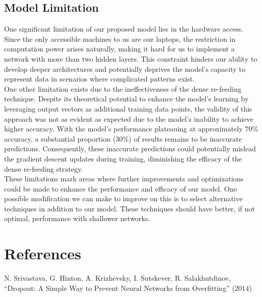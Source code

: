 \documentclass{article}
\begin{document}
\subsection{Model Limitation}
One significant limitation of our proposed model lies in the hardware access. Since the only accessible machines to us are our laptops, the restriction in computation power arises naturally, making it hard for us to implement a network with more than two hidden layers. This constraint hinders our ability to develop deeper architectures and potentially deprives the model's capacity to represent data in scenarios where complicated patterns exist.\\

\noindent One other limitation exists due to the ineffectiveness of the dense re-feeding technique. Despite its theoretical potential to enhance the model's learning by leveraging output vectors as additional training data points, the validity of this approach was not as evident as expected due to the model's inability to achieve higher accuracy. With the model's performance plateauing at approximately 70\% accuracy, a substantial proportion (30\%) of results remains to be inaccurate predictions. Consequently, these inaccurate predictions could potentially mislead the gradient descent updates during training, diminishing the efficacy of the dense re-feeding strategy.\\

\noindent These limitations mark areas where further improvements and optimizations could be made to enhance the performance and efficacy of our model. One possible modification we can make to improve on this is to select alternative techniques in addition to our model. These techniques should have better, if not optimal, performance with shallower networks. 

\section{References}
N. Srivastava, G. Hinton, A. Krizhevsky, I. Sutskever, R. Salakhutdinov, “Dropout: A Simple Way to Prevent Neural Networks from Overfitting” (2014)
\end{document}
